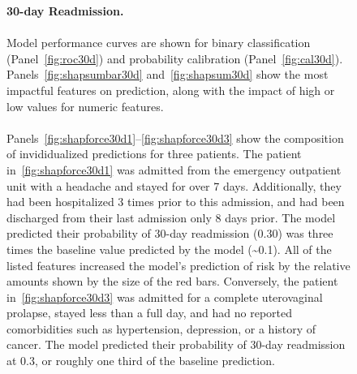 \begin{figure}
\begin{adjustbox}{minipage={\linewidth},frame}
\caption{\textbf{30-day Readmission.} \\\\
Model performance curves are shown for binary classification (Panel~\ref{fig:roc30d}) and probability calibration (Panel~\ref{fig:cal30d}).
Panels~\ref{fig:shapsumbar30d} and~\ref{fig:shapsum30d} show the most impactful features on prediction, 
along with the impact of high or low values for numeric features.\\\\
Panels~\ref{fig:shapforce30d1}--\ref{fig:shapforce30d3} show the composition of invididualized predictions for three patients.\@
The patient in~\ref{fig:shapforce30d1} was admitted from the emergency outpatient unit with a headache and stayed for over 7 days.\@
Additionally, they had been hospitalized 3 times prior to this admission, and had been discharged from their last admission only 8 days prior.\@
The model predicted their probability of 30-day readmission (0.30) was three times the baseline value predicted by the model (\textasciitilde0.1).\@
All of the listed features increased the model's prediction of risk by the relative amounts shown by the size of the red bars.\@
Conversely, the patient in~\ref{fig:shapforce30d3} was admitted for a complete uterovaginal prolapse, stayed less than a full day, and had
no reported comorbidities such as hypertension, depression, or a history of cancer.\@
The model predicted their probability of 30-day readmission at 0.3, or roughly one third of the baseline prediction.
}\label{fig:30dreadmission}
\end{adjustbox}
\end{figure}
